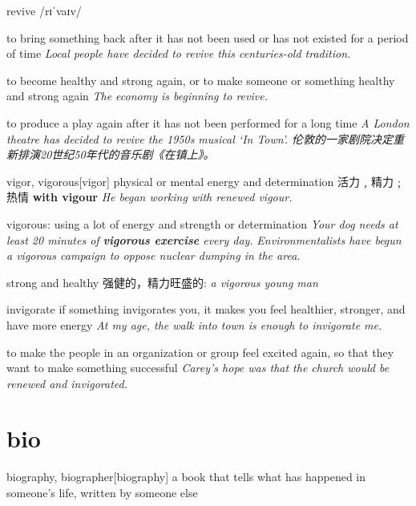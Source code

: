 \begin{DefWord}{revive}
    /rɪˈvaɪv/

    to bring something back after it has not been used or has not existed for a period of time
    \textit{Local people have decided to revive this centuries-old tradition.}

    to become healthy and strong again, or to make someone or something healthy and strong again
    \textit{The economy is beginning to revive.}

    to produce a play again after it has not been performed for a long time
    \textit{A London theatre has decided to revive the 1950s musical ‘In Town’. 伦敦的一家剧院决定重新排演20世纪50年代的音乐剧《在镇上》。}
\end{DefWord}

\begin{DefWord}{vigor, vigorous}[vigor]
    physical or mental energy and determination 活力﹐精力﹔热情
    \textbf{with vigour}
    \textit{He began working with renewed vigour.}

    vigorous: using a lot of energy and strength or determination
    \textit{Your dog needs at least 20 minutes of \textbf{vigorous exercise} every day.}
    \textit{Environmentalists have begun a vigorous campaign to oppose nuclear dumping in the area.}

    strong and healthy 强健的，精力旺盛的:
    \textit{a vigorous young man}
\end{DefWord}

\begin{DefWord}{invigorate}
    if something invigorates you, it makes you feel healthier, stronger, and have more energy
    \textit{At my age, the walk into town is enough to invigorate me.}

    to make the people in an organization or group feel excited again, so that they want to make something successful
    \textit{Carey’s hope was that the church would be renewed and invigorated.}
\end{DefWord}

\section{bio}

\begin{DefWord}{biography, biographer}[biography]
    a book that tells what has happened in someone’s life, written by someone else
\end{DefWord}

